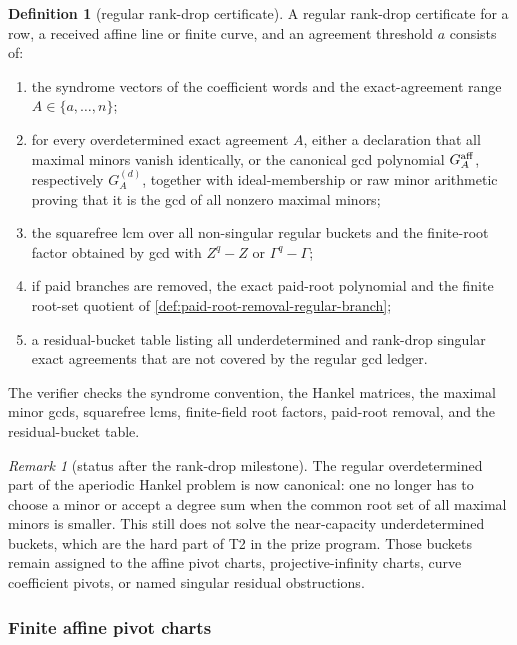 \documentclass[11pt]{article}
\theoremstyle{definition}
\newtheorem{definition}[theorem]{Definition}
\theoremstyle{remark}
\newtheorem{remark}[theorem]{Remark}
\begin{document}
\begin{definition}[regular rank-drop certificate]
\label{def:regular-rankdrop-certificate}
A regular rank-drop certificate for a row, a received affine line or finite
curve, and an agreement threshold $a$ consists of:
\begin{enumerate}[label=\textup{(\roman*)},leftmargin=2.2em]
\item the syndrome vectors of the coefficient words and the exact-agreement range
$A\in\{a,\ldots,n\}$;
\item for every overdetermined exact agreement $A$, either a declaration that all
maximal minors vanish identically, or the canonical gcd polynomial
$G_A^{\rm aff}$, respectively $G_A^{(d)}$, together with ideal-membership or raw
minor arithmetic proving that it is the gcd of all nonzero maximal minors;
\item the squarefree lcm over all non-singular regular buckets and the finite-root
factor obtained by gcd with $Z^q-Z$ or $\Gamma^q-\Gamma$;
\item if paid branches are removed, the exact paid-root polynomial and the finite
root-set quotient of \cref{def:paid-root-removal-regular-branch};
\item a residual-bucket table listing all underdetermined and rank-drop singular
exact agreements that are not covered by the regular gcd ledger.
\end{enumerate}
The verifier checks the syndrome convention, the Hankel matrices, the maximal
minor gcds, squarefree lcms, finite-field root factors, paid-root removal, and the
residual-bucket table.
\end{definition}

\begin{remark}[status after the rank-drop milestone]
\label{rem:rankdrop-milestone-status}
The regular overdetermined part of the aperiodic Hankel problem is now canonical:
one no longer has to choose a minor or accept a degree sum when the common root
set of all maximal minors is smaller.  This still does not solve the near-capacity
underdetermined buckets, which are the hard part of T2 in the prize program.
Those buckets remain assigned to the affine pivot charts, projective-infinity
charts, curve coefficient pivots, or named singular residual obstructions.
\end{remark}

\subsubsection{Finite affine pivot charts}
\end{document}
